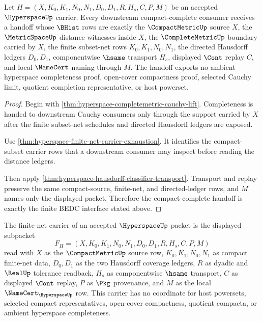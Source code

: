 \begin{theorem}
\label{thm:hyperspace-compact-complete-handoff}
Let $H=(X,K_0,K_1,N_0,N_1,D_0,D_1,R,H_s,C,P,M)$ be an accepted $\HyperspaceUp$ carrier. Every downstream compact-complete consumer receives a handoff whose $\BHist$ rows are exactly the $\CompactMetricUp$ source $X$, the $\MetricSpaceUp$ distance witnesses inside $X$, the $\CompleteMetricUp$ boundary carried by $X$, the finite subset-net rows $K_0,K_1,N_0,N_1$, the directed Hausdorff ledgers $D_0,D_1$, componentwise $\hsame$ transport $H_s$, displayed $\Cont$ replay $C$, and local $\NameCert$ naming through $M$. The handoff exports no ambient hyperspace completeness proof, open-cover compactness proof, selected Cauchy limit, quotient completion representative, or host powerset.
\end{theorem}
\begin{proof}
Begin with \autoref{thm:hyperspace-completemetric-cauchy-lift}. Completeness is handed to downstream Cauchy consumers only through the support carried by $X$ after the finite subset-net schedules and directed Hausdorff ledgers are exposed.

Use \autoref{thm:hyperspace-finite-net-carrier-exhaustion}. It identifies the compact-subset carrier rows that a downstream consumer may inspect before reading the distance ledgers.

Then apply \autoref{thm:hyperspace-hausdorff-classifier-transport}. Transport and replay preserve the same compact-source, finite-net, and directed-ledger rows, and $M$ names only the displayed packet. Therefore the compact-complete handoff is exactly the finite BEDC interface stated above.
\end{proof}

\begin{definition}
\label{def:hyperspace-finite-net-carrier}
The finite-net carrier of an accepted $\HyperspaceUp$ packet is the displayed subpacket
$$
F_H=(X,K_0,K_1,N_0,N_1,D_0,D_1,R,H_s,C,P,M)
$$
read with $X$ as the $\CompactMetricUp$ source row, $K_0,K_1,N_0,N_1$ as compact finite-net data, $D_0,D_1$ as the two Hausdorff coverage ledgers, $R$ as dyadic and $\RealUp$ tolerance readback, $H_s$ as componentwise $\hsame$ transport, $C$ as displayed $\Cont$ replay, $P$ as $\Pkg$ provenance, and $M$ as the local $\NameCert_{\HyperspaceUp}$ row. This carrier has no coordinate for host powersets, selected compact representatives, open-cover compactness, quotient compacta, or ambient hyperspace completeness.
\end{definition}

